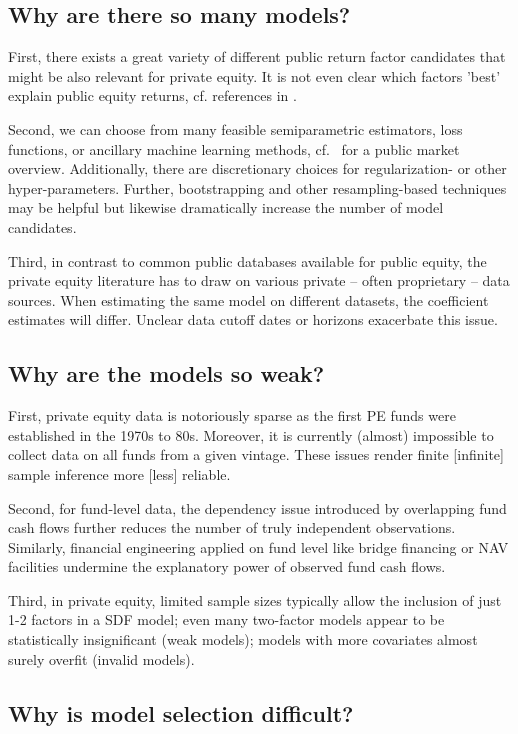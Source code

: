 \documentclass[12pt]{article}
\begin{document}
\subsection{Why are there so many models?}

First, there exists a great variety of different public return factor candidates that might be also relevant for private equity. 
It is not even clear which factors 'best' explain public equity returns, cf. references in \cite{KN20}. 

Second, we can choose from many feasible semiparametric estimators, loss functions, or ancillary machine learning methods, cf.\ \cite{GKX20} for a public market overview.
Additionally, there are discretionary choices for regularization- or other hyper-parameters.
Further, bootstrapping and other resampling-based techniques may be helpful but likewise dramatically increase the number of model candidates.

Third, in contrast to common public databases available for public equity, the private equity literature has to draw on various private -- often proprietary -- data sources. 
When estimating the same model on different datasets, the coefficient estimates will differ. 
Unclear data cutoff dates or horizons exacerbate this issue.

\subsection{Why are the models so weak?}

First, private equity data is notoriously sparse as the first PE funds were established in the 1970s to 80s.
Moreover, it is currently (almost) impossible to collect data on all funds from a given vintage. 
These issues render finite [infinite] sample inference more [less] reliable.

Second, for fund-level data, the dependency issue introduced by overlapping fund cash flows further reduces the number of truly independent observations. 
Similarly, financial engineering applied on fund level like bridge financing or NAV facilities undermine the explanatory power of observed fund cash flows.

Third, in private equity, limited sample sizes typically allow the inclusion of just 1-2 factors in a SDF model; 
even many two-factor models appear to be statistically insignificant (weak models); 
models with more covariates almost surely overfit (invalid models).


\subsection{Why is model selection difficult?}
\end{document}
